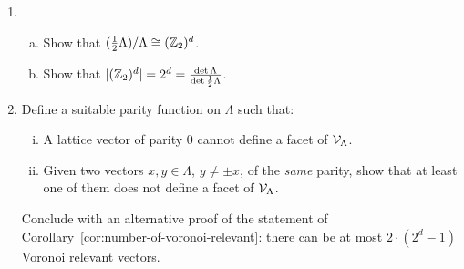 \begin{enumerate}
  \item
    \begin{enumerate}[(a)]
    \item Show that $(\frac{1}{2} \Lambda) / \Lambda \cong (\mathbb{Z}_2)^d$.

    \item Show that $|(\mathbb{Z}_2)^d| = 2^d = \frac{\det\Lambda}{\det \frac{1}{2} \Lambda}$.
    \end{enumerate}

  \item
    Define a suitable parity function on $\Lambda$ such that:
    \begin{enumerate}[(i)]
      \item A lattice vector of parity $0$ cannot define a facet of $\mathcal{V}_\Lambda$.

      \item Given two vectors $x, y \in \Lambda$, $y \neq \pm x$, of the \emph{same} parity,
        show that at least one of them does not define a facet of $\mathcal{V}_\Lambda$.
    \end{enumerate}
    Conclude with an alternative proof of the statement of Corollary~\ref{cor:number-of-voronoi-relevant}:
    there can be at most $2 \cdot (2^d - 1)$ Voronoi relevant vectors.
\end{enumerate}
